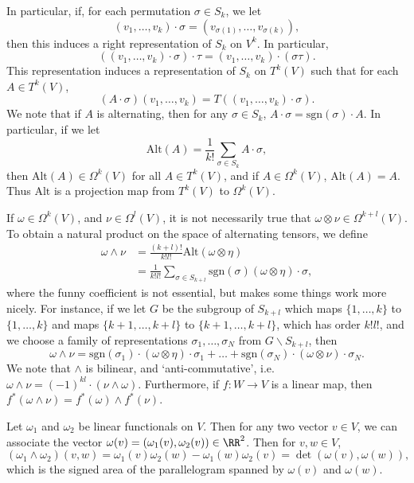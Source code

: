 In particular, if, for each permutation $\sigma \in S_k$, we let
%
\[ (v_1, \dots, v_k) \cdot \sigma = (v_{\sigma(1)}, \dots, v_{\sigma(k)}), \]
%
then this induces a right representation of $S_k$ on $V^k$. In particular,
%
\[ ((v_1, \dots, v_k) \cdot \sigma) \cdot \tau = (v_1, \dots, v_k) \cdot (\sigma \tau). \]
%
This representation induces a representation of $S_k$ on $T^k(V)$ such that for each $A \in T^k(V)$,
%
\[ (A \cdot \sigma)(v_1, \dots, v_k) = T((v_1, \dots, v_k) \cdot \sigma). \]
%
We note that if $A$ is alternating, then for any $\sigma \in S_k$, $A \cdot \sigma = \text{sgn}(\sigma) \cdot A$. In particular, if we let
%
\[ \text{Alt}(A) = \frac{1}{k!} \sum_{\sigma \in S_k} A \cdot \sigma, \]
%
then $\text{Alt}(A) \in \Omega^k(V)$ for all $A \in T^k(V)$, and if $A \in \Omega^k(V)$, $\text{Alt}(A) = A$. Thus $\text{Alt}$ is a projection map from $T^k(V)$ to $\Omega^k(V)$.

If $\omega \in \Omega^k(V)$, and $\nu \in \Omega^l(V)$, it is not necessarily true that $\omega \otimes \nu \in \Omega^{k+l}(V)$. To obtain a natural product on the space of alternating tensors, we define
%
\begin{align*}
    \omega \wedge \nu &= \frac{(k+l)!}{k! l!} \text{Alt}(\omega \otimes \eta)\\
    &= \frac{1}{k!l!} \sum_{\sigma \in S_{k+l}} \text{sgn}(\sigma) (\omega \otimes \eta) \cdot \sigma,
\end{align*}
%
where the funny coefficient is not essential, but makes some things work more nicely. For instance, if we let $G$ be the subgroup of $S_{k+l}$ which maps $\{ 1, \dots, k \}$ to $\{ 1, \dots, k \}$ and maps $\{ k+1, \dots, k+l \}$ to $\{ k+1, \dots, k+l \}$, which has order $k! l!$, and we choose a family of representations $\sigma_1, \dots, \sigma_N$ from $G \backslash S_{k+l}$, then
%
\[ \omega \wedge \nu = \text{sgn}(\sigma_1) \cdot (\omega \otimes \eta) \cdot \sigma_1 + \dots + \text{sgn}(\sigma_N) \cdot (\omega \otimes \nu) \cdot \sigma_N. \]
%
We note that $\wedge$ is bilinear, and `anti-commutative', i.e. $\omega \wedge \nu = (-1)^{kl} \cdot (\nu \wedge \omega)$. Furthermore, if $f: W \to V$ is a linear map, then $f^*(\omega \wedge \nu) = f^*(\omega) \wedge f^*(\nu)$.

\begin{example}
    Let $\omega_1$ and $\omega_2$ be linear functionals on $V$. Then for any two vector $v \in V$, we can associate the vector $\omega(v) = (\omega_1(v), \omega_2(v)) \in \RR^2$. Then for $v,w \in V$,
    \[ (\omega_1 \wedge \omega_2)(v,w) = \omega_1(v) \omega_2(w) - \omega_1(w) \omega_2(v) = \det(\omega(v), \omega(w)), \]
    which is the signed area of the parallelogram spanned by $\omega(v)$ and $\omega(w)$.
\end{example}

